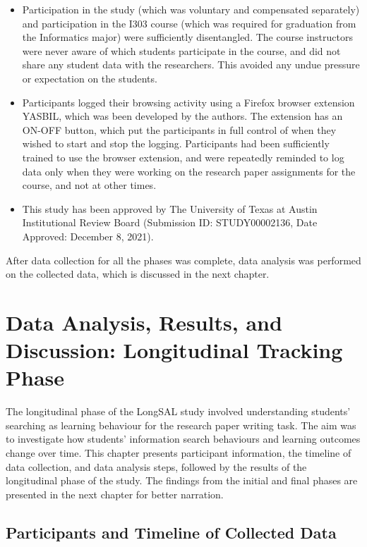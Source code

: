 \documentclass[letterpaper, nobind]{templates/ociamthesis}
\begin{document}
\begin{itemize}
\item
  Participation in the study (which was voluntary and compensated separately) and participation in the I303 course (which was required for graduation from the Informatics major) were sufficiently disentangled. The course instructors were never aware of which students participate in the course, and did not share any student data with the researchers. This avoided any undue pressure or expectation on the students.
\item
  Participants logged their browsing activity using a Firefox browser extension YASBIL, which was been developed by the authors. The extension has an ON-OFF button, which put the participants in full control of when they wished to start and stop the logging. Participants had been sufficiently trained to use the browser extension, and were repeatedly reminded to log data only when they were working on the research paper assignments for the course, and not at other times.
\item
  This study has been approved by The University of Texas at Austin Institutional Review Board (Submission ID: STUDY00002136, Date Approved: December 8, 2021).
\end{itemize}

After data collection for all the phases was complete, data analysis was performed on the collected data, which is discussed in the next chapter.

\hypertarget{data-analysis-results-and-discussion-longitudinal-tracking-phase}{%
\chapter{Data Analysis, Results, and Discussion: Longitudinal Tracking Phase}\label{data-analysis-results-and-discussion-longitudinal-tracking-phase}}

The longitudinal phase of the LongSAL study involved understanding students' searching as learning behaviour for the research paper writing task. The aim was to investigate how students' information search behaviours and learning outcomes change over time.
This chapter presents participant information, the timeline of data collection, and data analysis steps, followed by the results of the longitudinal phase of the study.
The findings from the initial and final phases are presented in the next chapter for better narration.

\hypertarget{participants-and-timeline-of-collected-data}{%
\section{Participants and Timeline of Collected Data}\label{participants-and-timeline-of-collected-data}}
\end{document}
